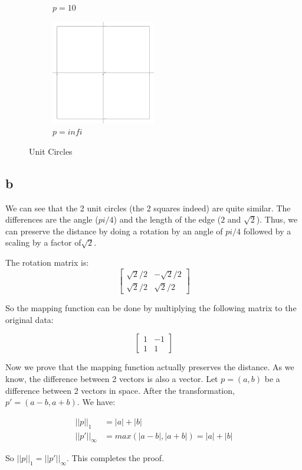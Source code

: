 \begin{figure}[!htb]
\begin{subfigure}{0.49\textwidth}
    \caption{$p = 10$}
    \label{unit_circle_10}
  \end{subfigure}
  \begin{subfigure}{0.49\textwidth}
    \includegraphics[width=0.5\textwidth]{shots/unit_circle_infi}
    \caption{$p = infi$}
    \label{unit_circle_infi}
  \end{subfigure}
  \caption{Unit Circles}
  \label{unit_circles}
\end{figure}

\subsection*{b}
We can see that the 2 unit circles (the 2 squares indeed) are quite similar. The differences are the angle ($pi/4$) and the length of the edge ($2$ and $\sqrt{2}$).
Thus, we can preserve the distance by doing a rotation by an angle of $pi/4$ followed by a scaling by a factor of$\sqrt{2}$.

The rotation matrix is:
$$
\begin{bmatrix}
  \sqrt{2}/2   & -\sqrt{2}/2  \\
  \sqrt{2}/2   & \sqrt{2}/2
\end{bmatrix}
$$

So the mapping function can be done by multiplying the following matrix to the original data:

$$
\begin{bmatrix}
  1 & -1  \\
  1 & 1 
\end{bmatrix}
$$

Now we prove that the mapping function actually preserves the distance. As we know, the difference between 2 vectors is also a vector. Let $p = (a, b)$ be a difference
between 2 vectors in space. After the transformation, $p' = (a - b, a + b)$. We have:

\begin{align*}
  ||p||_1 &= |a| + |b| \\
  ||p'||_\infty &= max(|a - b|, |a + b|) = |a| + |b|
\end{align*}

So $||p||_1 = ||p'||_\infty$. This completes the proof.
